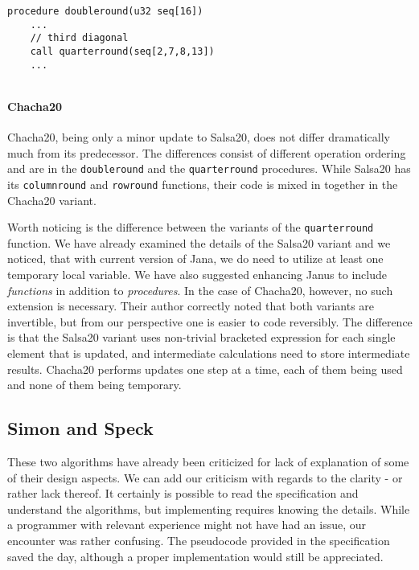 \documentclass[a4paper,10pt,openright]{memoir}
\newcommand{\term}[1]{\textit{#1}}
\newcommand{\code}[1]{\texttt{#1}}
\begin{document}
\begin{lstlisting}[language=Janus]
procedure doubleround(u32 seq[16])
	...
	// third diagonal
	call quarterround(seq[2,7,8,13])
	...
\end{lstlisting}


\begin{lstlisting}[language=Janus]
\end{lstlisting}

\paragraph{Chacha20}

Chacha20, being only a minor update to Salsa20, does not differ 
dramatically much from its predecessor. The differences consist of 
different operation ordering and are in the \code{doubleround} and the 
\code{quarterround} procedures. While Salsa20 has its 
\code{columnround} and \code{rowround} functions, their code is mixed 
in together in the Chacha20 variant.

Worth noticing is the difference between the variants of the 
\code{quarterround} function. We have already examined the details of 
the Salsa20 variant and we noticed, that with current version of Jana, 
we do need to utilize at least one temporary local variable. We have 
also suggested enhancing Janus to include \term{functions} in addition 
to \term{procedures}. In the case of Chacha20, however, no such 
extension is necessary. Their author correctly noted that both variants 
are invertible, but from our perspective one is easier to code 
reversibly. The difference is that the Salsa20 variant uses non-trivial 
bracketed expression for each single element that is updated, and 
intermediate calculations need to store intermediate results. Chacha20 
performs updates one step at a time, each of them being used and none 
of them being temporary.

\subsection{Simon and Speck}

These two algorithms have already been criticized for lack of 
explanation of some of their design aspects. We can add our criticism 
with regards to the clarity - or rather lack thereof. It certainly is 
possible to read the specification and understand the algorithms, but 
implementing requires knowing the details. While a programmer with 
relevant experience might not have had an issue, our encounter was 
rather confusing. The pseudocode provided in the specification saved 
the day, although a proper implementation would still be appreciated.
\end{document}
